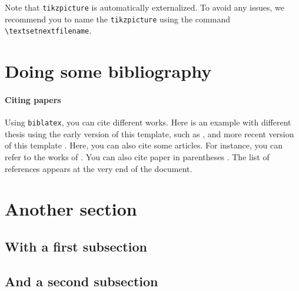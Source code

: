 \begin{remark}
    Note that \texttt{tikzpicture} is automatically externalized.
    To avoid any issues, we recommend you to name the \texttt{tikzpicture} using the command \texttt{\textbackslash textsetnextfilename}.
\end{remark}


\section{Doing some bibliography}%
\label{sec:doing_some_bibliography}

\paragraph{Citing papers}%
\label{par:Citing papers}
Using \texttt{biblatex}, you can cite different works.
Here is an example with different thesis using the early version of this template, such as \textcite{cherriere_elaboration_2023,caruel_caracterisation_2023,ruda_methode_2023,abdel_hafiz_etude_2023}, and more recent version of this template \parencite{daby-seesaram_towards_2023,loiseau_formulation_2023}.
Here, you can also cite some articles.
For instance, you can refer to the works of \textcite{wurtzer_premiere_2022,ribeiro_nogueira_differential_2024}.
You can also cite paper in parentheses \parencite{ruda_first_2022,daby-seesaram_hybrid_2023}.
The list of references appears at the very end of the document.

\section{Another section}%
\label{sec:Another section}

\subsection{With a first subsection}%
\label{sub:with_a_first_subsection}

\lipsum[2-4]

\subsection{And a second subsection}%
\label{sub:and_a_second_subsection}

\lipsum[2-4]

\begin{chaptersummary}
    \lipsum
\end{chaptersummary}
